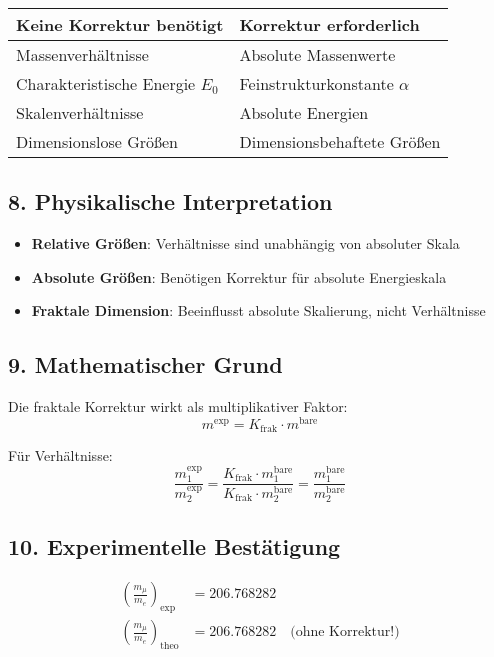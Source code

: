 \documentclass[12pt,a4paper]{article}
\theoremstyle{definition}
\begin{document}
\begin{tabular}{p{}p{}}
	\textbf{Keine Korrektur benötigt} & \textbf{Korrektur erforderlich} \\
	\hline
	Massenverhältnisse & Absolute Massenwerte \\
	Charakteristische Energie $E_0$ & Feinstrukturkonstante $\alpha$ \\
	Skalenverhältnisse & Absolute Energien \\
	Dimensionslose Größen & Dimensionsbehaftete Größen \\
\end{tabular}

\subsection{8. Physikalische Interpretation}

\begin{itemize}
	\item \textbf{Relative Größen}: Verhältnisse sind unabhängig von absoluter Skala
	\item \textbf{Absolute Größen}: Benötigen Korrektur für absolute Energieskala
	\item \textbf{Fraktale Dimension}: Beeinflusst absolute Skalierung, nicht Verhältnisse
\end{itemize}

\subsection{9. Mathematischer Grund}

Die fraktale Korrektur wirkt als multiplikativer Faktor:
\[
m^{\text{exp}} = K_{\text{frak}} \cdot m^{\text{bare}}
\]

Für Verhältnisse:
\[
\frac{m_1^{\text{exp}}}{m_2^{\text{exp}}} = \frac{K_{\text{frak}} \cdot m_1^{\text{bare}}}{K_{\text{frak}} \cdot m_2^{\text{bare}}} = \frac{m_1^{\text{bare}}}{m_2^{\text{bare}}}
\]

\subsection{10. Experimentelle Bestätigung}

\begin{align*}
	\left(\frac{m_\mu}{m_e}\right)_{\text{exp}} &= 206.768282 \\
	\left(\frac{m_\mu}{m_e}\right)_{\text{theo}} &= 206.768282 \quad \text{(ohne Korrektur!)}
\end{align*}
\end{document}
